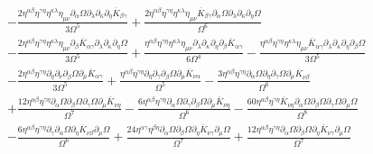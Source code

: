 \documentclass[10pt,letterpaper]{article}
\numberwithin{equation}{section}
\begin{document}
\begin{align}
&-  \frac{2 \eta^{\alpha \beta} \eta^{\gamma \eta} \eta^{\kappa \lambda} \eta_{\mu \nu} \partial_{\alpha}\Omega \partial_{\lambda}\partial_{\kappa}\partial_{\eta}\overline{K}_{\beta \gamma}}{3 \Omega^5} + \frac{2 \eta^{\alpha \beta} \eta^{\gamma \eta} \eta^{\kappa \lambda} \eta_{\mu \nu} \overline{K}_{\beta \gamma} \partial_{\alpha}\Omega \partial_{\lambda}\partial_{\kappa}\partial_{\eta}\Omega}{\Omega^6}\nonumber \\
& -  \frac{2 \eta^{\alpha \beta} \eta^{\gamma \eta} \eta^{\kappa \lambda} \eta_{\mu \nu} \partial_{\beta}\overline{K}_{\alpha \gamma} \partial_{\lambda}\partial_{\kappa}\partial_{\eta}\Omega}{3 \Omega^5} + \frac{\eta^{\alpha \beta} \eta^{\gamma \eta} \eta^{\kappa \lambda} \eta_{\mu \nu} \partial_{\lambda}\partial_{\kappa}\partial_{\eta}\partial_{\beta}\overline{K}_{\alpha \gamma}}{6 \Omega^4} -  \frac{\eta^{\alpha \beta} \eta^{\gamma \eta} \eta^{\kappa \lambda} \eta_{\mu \nu} \overline{K}_{\alpha \gamma} \partial_{\lambda}\partial_{\kappa}\partial_{\eta}\partial_{\beta}\Omega}{3 \Omega^5}\nonumber \\
& -  \frac{2 \eta^{\alpha \beta} \eta^{\gamma \eta} \partial_{\eta}\partial_{\nu}\partial_{\beta}\Omega \partial_{\mu}\overline{K}_{\alpha \gamma}}{3 \Omega^5} + \frac{\eta^{\alpha \beta} \eta^{\gamma \eta} \partial_{\eta}\partial_{\gamma}\partial_{\beta}\Omega \partial_{\mu}\overline{K}_{\nu \alpha}}{\Omega^5} -  \frac{3 \eta^{\alpha \beta} \eta^{\gamma \eta} \partial_{\alpha}\Omega \partial_{\eta}\partial_{\gamma}\Omega \partial_{\mu}\overline{K}_{\nu \beta}}{\Omega^6} \nonumber \\
&+ \frac{12 \eta^{\alpha \beta} \eta^{\gamma \eta} \partial_{\alpha}\Omega \partial_{\beta}\Omega \partial_{\gamma}\Omega \partial_{\mu}\overline{K}_{\nu \eta}}{\Omega^7} -  \frac{6 \eta^{\alpha \beta} \eta^{\gamma \eta} \partial_{\alpha}\Omega \partial_{\gamma}\partial_{\beta}\Omega \partial_{\mu}\overline{K}_{\nu \eta}}{\Omega^6} -  \frac{60 \eta^{\alpha \beta} \eta^{\gamma \eta} \overline{K}_{\nu \eta} \partial_{\alpha}\Omega \partial_{\beta}\Omega \partial_{\gamma}\Omega \partial_{\mu}\Omega}{\Omega^8}\nonumber \\
& -  \frac{6 \eta^{\alpha \beta} \eta^{\gamma \eta} \partial_{\gamma}\partial_{\alpha}\Omega \partial_{\eta}\overline{K}_{\nu \beta} \partial_{\mu}\Omega}{\Omega^6} + \frac{24 \eta^{\alpha \gamma} \eta^{\beta \eta} \partial_{\alpha}\Omega \partial_{\beta}\Omega \partial_{\eta}\overline{K}_{\nu \gamma} \partial_{\mu}\Omega}{\Omega^7} + \frac{12 \eta^{\alpha \beta} \eta^{\gamma \eta} \partial_{\alpha}\Omega \partial_{\beta}\Omega \partial_{\eta}\overline{K}_{\nu \gamma} \partial_{\mu}\Omega}{\Omega^7}\nonumber \\

\end{align}
\end{document}

